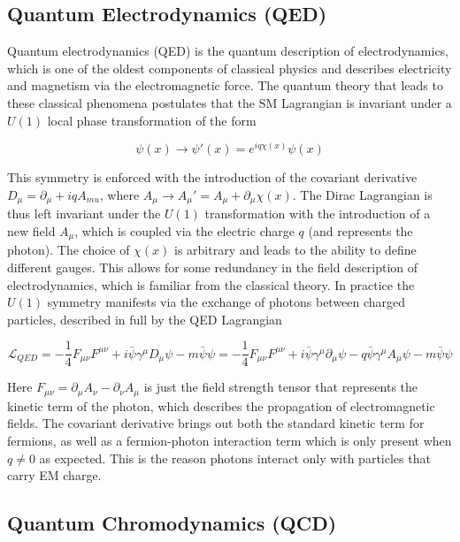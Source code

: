 \subsection{Quantum Electrodynamics (QED)}

Quantum electrodynamics (QED) is the quantum description of electrodynamics, which is one of the oldest 
components of classical physics and describes electricity and magnetism via the electromagnetic force. The 
quantum theory that leads to these classical phenomena postulates that the SM Lagrangian is invariant under a 
$U(1)$ local phase transformation of the form 

\begin{equation}
\psi(x) \rightarrow \psi'(x) = e^{iq\chi(x)}\psi(x)
\end{equation}

This symmetry is enforced with the introduction of the covariant derivative $D_{\mu} = \partial_{\mu} + iqA_{mu}$, 
where $A_{\mu} \rightarrow A_{\mu}' = A_{\mu} + \partial_{\mu}\chi(x)$. The Dirac Lagrangian is thus left invariant 
under the $U(1)$ transformation with the introduction of a new field $A_{\mu}$, which is coupled via the electric 
charge $q$ (and represents the photon). The choice of $\chi(x)$ is arbitrary and leads to the ability to define 
different gauges. This allows for some redundancy in the field description of electrodynamics, which is familiar from 
the classical theory. In practice the $U(1)$ symmetry manifests via the exchange of photons between charged 
particles, described in full by the QED Lagrangian

\begin{equation}
\mathcal{L}_{QED} = - \frac{1}{4}F_{\mu\nu}F^{\mu\nu} + i\bar{\psi}\gamma^{\mu}D_{\mu}\psi - m\bar{\psi}\psi =
- \frac{1}{4}F_{\mu\nu}F^{\mu\nu} + i\bar{\psi}\gamma^{\mu}\partial_{\mu}\psi - q\bar{\psi}\gamma^{\mu}A_{\mu}\psi - m\bar{\psi}\psi
\end{equation}

Here $F_{\mu\nu} = \partial_{\mu}A_{\nu}  - \partial_{\nu}A_{\mu}$ is just the field strength tensor that represents 
the kinetic term of the photon, which describes the propagation of electromagnetic fields. The covariant derivative 
brings out both the standard kinetic term for fermions, as well as a fermion-photon interaction term which is only 
present when $q \neq 0$ as expected. This is the reason photons interact only with particles that carry EM charge.

\subsection{Quantum Chromodynamics (QCD)}

